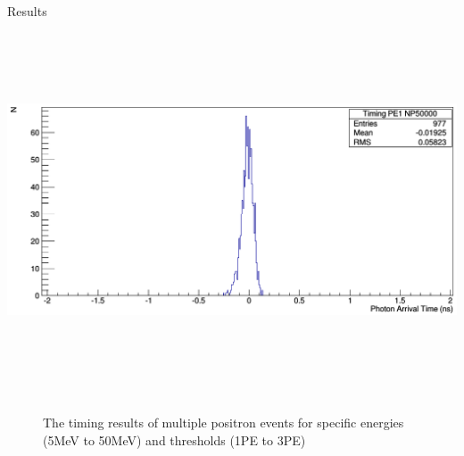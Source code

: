 \documentclass[final]{beamer}
\newlength{\onecolwid}
\newlength{\twocolwid}
\begin{document}
\begin{frame}[t]
\begin{columns}[t]
\begin{column}{\twocolwid}
\begin{columns}[t,totalwidth=\twocolwid]
\begin{column}{\onecolwid}
\begin{block}{Results}
\includegraphics[height=11.2cm]{d4}
\newline

\begin{figure}


\caption{The timing results of multiple positron events for specific energies (5MeV to 50MeV) and thresholds (1PE to 3PE)}
\end{figure}





\end{block}




\end{column} %

\end{columns} %






\end{column}
\end{columns}
\end{frame}
\end{document}
